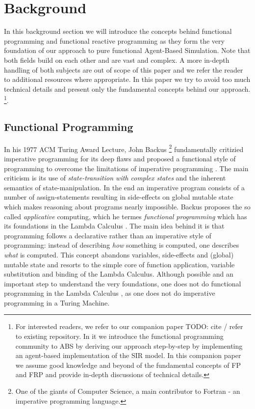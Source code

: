 \section{Background}
In this background section we will introduce the concepts behind functional programming and functional reactive programming as they form the very foundation of our approach to pure functional Agent-Based Simulation. Note that both fields build on each other and are vast and complex. A more in-depth handling of both subjects are out of scope of this paper and we refer the reader to additional resources where appropriate. In this paper we try to avoid too much technical details and present only the fundamental concepts behind our approach. \footnote{For interested readers, we refer to our companion paper TODO: cite / refer to existing repository. In it we introduce the functional programming community to ABS by deriving our approach step-by-step by implementing an agent-based implementation of the SIR model. In this companion paper we assume good knowledge and beyond of the fundamental concepts of FP and FRP and provide in-depth discussions of technical details.}.

\subsection{Functional Programming}
In his 1977 ACM Turing Award Lecture, John Backus \footnote{One of the giants of Computer Science, a main contributor to Fortran - an imperative programming language.} fundamentally critizied imperative programming for its deep flaws and proposed a functional style of programming to overcome the limitations of imperative programming \cite{backus_can_1978}. The main criticism is its use of \textit{state-transition with complex states} and the inherent semantics of state-manipulation. In the end an imperative program consists of a number of assign-statements resulting in side-effects on global mutable state which makes reasoning about programs nearly impossible. Backus proposes the so called \textit{applicative} computing, which he termes \textit{functional programming} which has its foundations in the Lambda Calculus \cite{church_calculi_1941}. The main idea behind it is that programming follows a declarative rather than an imperative style of programming: instead of describing \textit{how} something is computed, one describes \textit{what} is computed. This concept abandons variables, side-effects and (global) mutable state and resorts to the simple core of function application, variable substitution and binding of the Lambda Calculus. Although possible and an important step to understand the very foundations, one does not do functional programming in the Lambda Calculus \cite{michaelson_introduction_2011}, as one does not do imperative programming in a Turing Machine.

